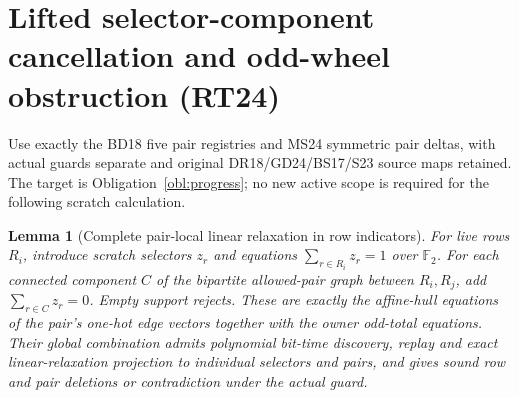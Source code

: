 \documentclass[11pt]{article}
\newtheorem{lemma}[theorem]{Lemma}
\begin{document}
\section{Lifted selector-component cancellation and odd-wheel obstruction (RT24)}\label{sec:rt24}
Use exactly the BD18 five pair registries and MS24 symmetric pair deltas, with actual guards separate and original DR18/GD24/BS17/S23 source maps retained. The target is Obligation~\ref{obl:progress}; no new active scope is required for the following scratch calculation.
\begin{lemma}[Complete pair-local linear relaxation in row indicators]\label{lem:rt24-selector}
For live rows $R_i$, introduce scratch selectors $z_r$ and equations $\sum_{r\in R_i}z_r=1$ over $\mathbb F_2$. For each connected component $C$ of the bipartite allowed-pair graph between $R_i,R_j$, add $\sum_{r\in C}z_r=0$. Empty support rejects. These are exactly the affine-hull equations of the pair's one-hot edge vectors together with the owner odd-total equations. Their global combination admits polynomial bit-time discovery, replay and exact linear-relaxation projection to individual selectors and pairs, and gives sound row and pair deletions or contradiction under the actual guard.
\end{lemma}
\end{document}
